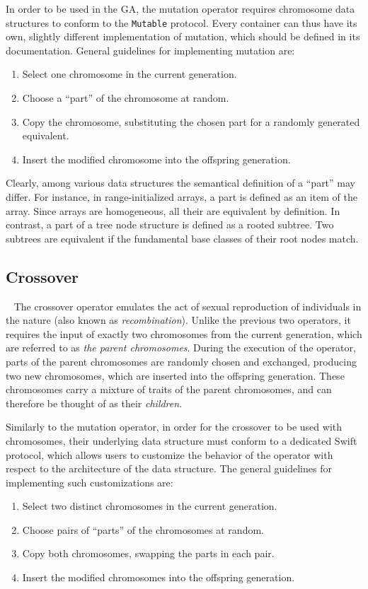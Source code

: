 In order to be used in the GA, the mutation operator requires chromosome data structures to conform to the \texttt{Mutable} protocol. Every container can thus have its own, slightly different implementation of mutation, which should be defined in its documentation. General guidelines for implementing mutation are:
~
\begin{enumerate}
	\item Select one chromosome in the current generation.
	\item Choose a ``part'' of the chromosome at random.
	\item Copy the chromosome, substituting the chosen part for a randomly generated equivalent.
	\item Insert the modified chromosome into the offspring generation.
\end{enumerate}

Clearly, among various data structures the semantical definition of a ``part'' may differ. For instance, in range-initialized arrays, a part is defined as an item of the array. Since arrays are homogeneous, all their are equivalent by definition. In contrast, a part of a tree node structure is defined as a rooted subtree. Two subtrees are equivalent if the fundamental base classes of their root nodes match.

\subsection{Crossover}~\label{section:crossover}
The crossover operator emulates the act of sexual reproduction of individuals in the nature (also known as \textit{recombination}). Unlike the previous two operators, it requires the input of exactly two chromosomes from the current generation, which are referred to as \textit{the parent chromosomes}. During the execution of the operator, parts of the parent chromosomes are randomly chosen and exchanged, producing two new chromosomes, which are inserted into the offspring generation. These chromosomes carry a mixture of traits of the parent chromosomes, and can therefore be thought of as their \textit{children}.

Similarly to the mutation operator, in order for the crossover to be used with chromosomes, their underlying data structure must conform to a dedicated Swift protocol, which allows users to customize the behavior of the operator with respect to the architecture of the data structure. The general guidelines for implementing such customizations are:
~
\begin{enumerate}
	\item Select two distinct chromosomes in the current generation.
	\item Choose pairs of ``parts'' of the chromosomes at random.
	\item Copy both chromosomes, swapping the parts in each pair.
	\item Insert the modified chromosomes into the offspring generation.
\end{enumerate}

